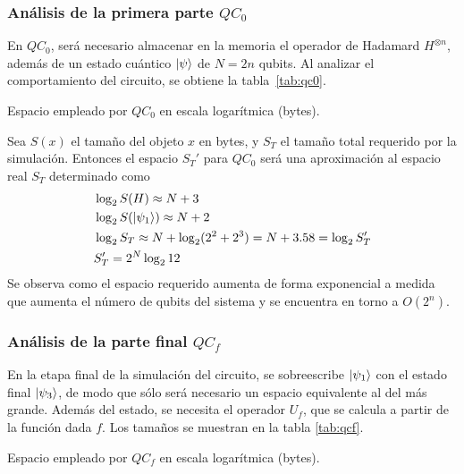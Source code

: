 \subsubsection{Análisis de la primera parte $QC_0$}
En $QC_0$, será necesario almacenar en la memoria el operador de Hadamard 
$H^{\otimes n}$, además de un estado cuántico $\ket{\psi}$ de $N = 2n$ qubits.  
Al analizar el comportamiento del circuito, se obtiene la tabla~\ref{tab:qc0}.
%
\begin{table}[!htb]
\centering

\caption{Espacio empleado por $QC_0$ en escala logarítmica (bytes).}
\label{tab:qc0}
\end{table}
%
Sea $S(x)$ el tamaño del objeto $x$ en bytes, y $S_T$ el tamaño total requerido 
por la simulación. Entonces el espacio $S_T'$ para $QC_0$ será una aproximación 
al espacio real $S_T$ determinado como
\begin{equation*}
\begin{split}
	&\log_2 S(H) \approx N + 3 \\
	&\log_2 S(\ket{\psi_{1}})  \approx N + 2 \\
	&\log_2 S_T \approx N+\log_2 (2^2+2^3) = N+3.58 = \log_2 S_T' \\
	& S_T' = 2^{N} \log_2 12
\end{split}
\end{equation*}
Se observa como el espacio requerido aumenta de forma exponencial a medida que 
aumenta el número de qubits del sistema y se encuentra en torno a $O(2^n)$.



\subsubsection{Análisis de la parte final $QC_f$}
En la etapa final de la simulación del circuito, se sobreescribe $\ket{\psi_{1}}$ con 
el estado final $\ket{\psi_{3}}$, de modo que sólo será necesario un espacio 
equivalente al del más grande.
Además del estado, se necesita el operador $U_f$, que se calcula a partir de la 
función dada $f$. Los tamaños se muestran en la tabla \ref{tab:qcf}.
%
\begin{table}[!htb]
\centering

\caption{Espacio empleado por $QC_f$ en escala logarítmica (bytes).}
\label{tab:qcf}
\end{table}

